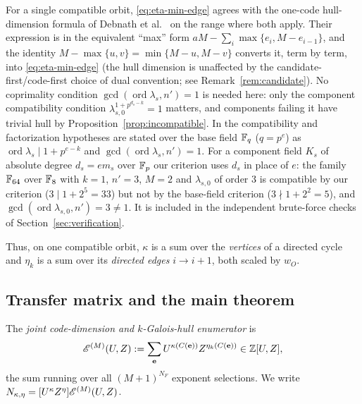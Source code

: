 \begin{remark}\label{rem:debnath-agreement}
For a single compatible orbit, \eqref{eq:eta-min-edge} agrees with the
one-code hull-dimension formula of Debnath et al.\
\cite{debnathAffine2026} on the range where both apply. Their expression is
in the equivalent ``max'' form
$aM-\sum_i\max\{e_i,M-e_{i-1}\}$, and the identity
$M-\max\{u,v\}=\min\{M-u,M-v\}$ converts it, term by term, into
\eqref{eq:eta-min-edge} (the hull dimension is unaffected by the
candidate-first/code-first choice of dual convention; see
Remark~\ref{rem:candidate}). No coprimality condition
$\gcd(\operatorname{ord}\lambda_s,n')=1$ is needed here: only the component
compatibility condition $\lambda_{s,0}^{1+p^{d_s-k}}=1$ matters, and
components failing it have trivial hull by
Proposition~\ref{prop:incompatible}.  In \cite{debnathAffine2026} the
compatibility and factorization hypotheses are stated over the base field
$\mathbb F_q$ ($q=p^e$) as $\operatorname{ord}\lambda_s\mid 1+p^{e-k}$ and
$\gcd(\operatorname{ord}\lambda_s,n')=1$.  For a component field $K_s$ of
absolute degree $d_s=em_s$ over $\mathbb F_p$ our criterion uses $d_s$ in place of
$e$: the
family $\mathbb F_{64}$ over $\mathbb F_8$ with $k=1$, $n'=3$, $M=2$ and
$\lambda_{s,0}$ of order $3$ is compatible by our criterion
($3\mid 1+2^{5}=33$) but not by the base-field criterion ($3\nmid
1+2^{2}=5$), and $\gcd(\operatorname{ord}\lambda_{s,0},n')=3\neq1$.  It is
included in the independent brute-force checks of
Section~\ref{sec:verification}.
\end{remark}

Thus, on one compatible orbit, $\kappa$ is a sum over the \emph{vertices} of a
directed cycle and $\eta_k$ is a sum over its \emph{directed edges}
$i\to i+1$, both scaled by $w_O$.

\subsection{Transfer matrix and the main theorem}\label{sec:transfer}

\begin{definition}\label{def:enumerator}
The \emph{joint code-dimension and $k$-Galois-hull enumerator} is
\[
\mathscr E^{(M)}(U,Z)
   :=\sum_{\mathbf{e}}U^{\kappa(C(\mathbf{e}))}
                      Z^{\eta_k(C(\mathbf{e}))}
   \in\mathbb{Z}[U,Z],
\]
the sum running over all $(M+1)^{N_F}$ exponent selections.  We write
$N_{\kappa,\eta}=[U^\kappa Z^\eta]\mathscr E^{(M)}(U,Z)$.
\end{definition}

